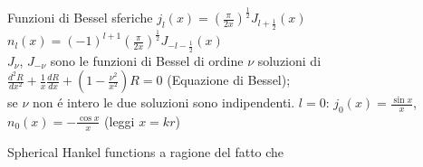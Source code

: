 \begin{frame}{Funzioni di Bessel sferiche}
$j_l(x)=(\frac{\pi}{2x})^{\frac{1}{2}}J_{l+\frac{1}{2}}(x)$\\
$n_l(x)=(-1)^{l+1}(\frac{\pi}{2x})^{\frac{1}{2}}J_{-l-\frac{1}{2}}(x)$\\
$J_{\nu}$, $J_{-\nu}$ sono le funzioni di Bessel di ordine $\nu$ soluzioni di \\
$\frac{d^2R}{dx^2}+\frac{1}{x}\frac{dR}{dx}+(1-\frac{\nu^2}{x^2})R=0$ (Equazione di Bessel);\\
 se $\nu$ non \'e intero le due soluzioni sono indipendenti.
\textbf{$l=0$}: $j_0(x)=\frac{\sin{x}}{x}$, $n_0(x)=-\frac{\cos{x}}{x}$
(leggi $x=kr$)

\end{frame}


\begin{frame}{Spherical Hankel functions}
 a ragione del fatto che \\
    
\end{frame}

